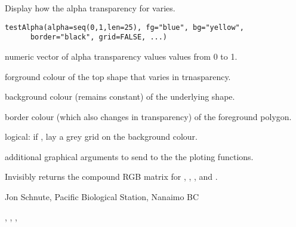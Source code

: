 \documentclass[letterpaper]{book}
\begin{document}
\begin{Description}\relax
Display how the alpha transparency for  varies.
\end{Description}
\begin{Usage}
\begin{verbatim}
testAlpha(alpha=seq(0,1,len=25), fg="blue", bg="yellow",
      border="black", grid=FALSE, ...)
\end{verbatim}
\end{Usage}
\begin{Arguments}
\begin{ldescription}
\item[\code{alpha}] numeric vector of alpha transparency values values from 0 to 1. 
\item[\code{fg}] forground colour of the top shape that varies in trnasparency. 
\item[\code{bg}] background colour (remains constant) of the underlying shape. 
\item[\code{border}] border colour (which also changes in transparency) of the foreground polygon. 
\item[\code{grid}] logical: if , lay a grey grid on the background colour. 
\item[\code{...}] additional graphical arguments to send to the the ploting functions. 
\end{ldescription}
\end{Arguments}
\begin{Value}
Invisibly returns the compound RGB matrix for , , 
, and .
\end{Value}
\begin{Author}\relax
Jon Schnute, Pacific Biological Station, Nanaimo BC
\end{Author}
\begin{SeeAlso}\relax
{}, , , 
\end{SeeAlso}
\end{document}
